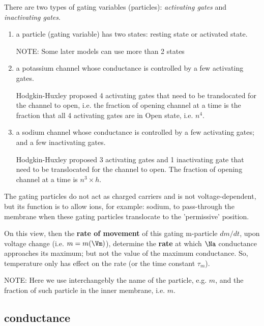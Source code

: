 There are two types of gating variables (particles): {\it activating gates} and
{\it inactivating gates}.
\begin{enumerate}
  \item a particle (gating variable) has two states: resting state or activated
  state. 
  
NOTE: Some later models can use more than 2 states
    
  \item a potassium channel whose conductance is controlled by a few activating gates.
  
  Hodgkin-Huxley proposed 4 activating gates that need to be
  translocated for the channel to open, i.e. the fraction of opening channel at
  a time is the fraction that all 4 activating gates are in Open state, i.e.
  $n^4$.
  
  
  \item a sodium channel whose conductance is controlled by a few 
  activating gates; and a few inactivating gates.
  
  
  Hodgkin-Huxley proposed 3 activating gates and 1 inactivating gate that need
  to be translocated for the channel to open. The fraction of opening channel at
  a time is $n^3 \times h$.
  
%   
%   
\end{enumerate}
The gating particles do not act as charged carriers and is not
voltage-dependent, but its function is to allow ions, for example: sodium, to
pass-through the membrane when these gating particles translocate to the
'permissive' position. 

On this view, then the {\bf rate of movement} of this gating m-particle $dm/dt$,
upon voltage change (i.e. $m=m(\Vm)$), determine the {\bf rate} at which $\Na$
conductance approaches its maximum; but not the value of the maximum
conductance. So, temperature only has effect on the rate (or the time constant
$\tau_m$).

\begin{mdframed}
NOTE: Here we use interchangebly the name of the particle, e.g. $m$, and the
fraction of such particle in the inner membrane, i.e. $m$.
\end{mdframed}


\subsection{\texorpdfstring{ conductance}{Na+ conductance}}
\label{sec:cena+-conductance}

